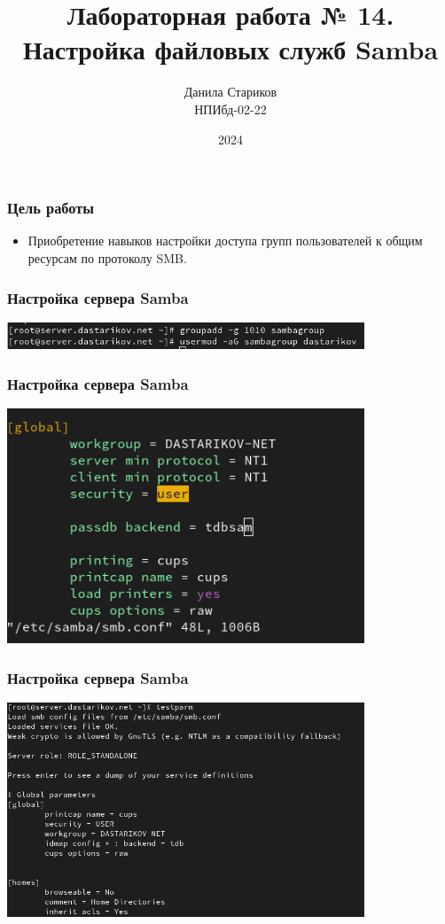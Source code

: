 

\title{Лабораторная работа № 14. \\ Настройка файловых служб Samba}
\author{Данила Стариков \\ НПИбд-02-22}
\date{2024}



\frame{\titlepage}

\begin{frame}
\frametitle{Цель работы}
\begin{itemize}
    \item Приобретение навыков настройки доступа групп пользователей к общим ресурсам по протоколу SMB.
\end{itemize}
\end{frame}

\begin{frame}
\frametitle{Настройка сервера Samba}
    \includegraphics[width=0.8\textwidth]{../images/image01.png}
\end{frame}


\begin{frame}
\frametitle{Настройка сервера Samba}
    \includegraphics[width=0.8\textwidth]{../images/image27.png}
\end{frame}


\begin{frame}
\frametitle{Настройка сервера Samba}
    \includegraphics[width=0.8\textwidth]{../images/image02.png}
\end{frame}


